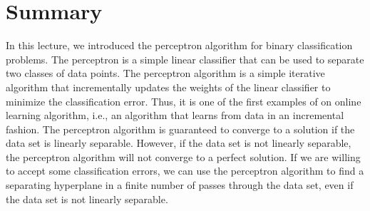 \documentclass{article}[12pt]
\begin{document}
\section{Summary}
In this lecture, we introduced the perceptron algorithm for binary classification problems.
The perceptron is a simple linear classifier that can be used to separate two classes of data points.
The perceptron algorithm is a simple iterative algorithm that incrementally updates the weights of the linear classifier to minimize the classification error.
Thus, it is one of the first examples of on online learning algorithm, i.e., an algorithm that learns from data in an incremental fashion.
The perceptron algorithm is guaranteed to converge to a solution if the data set is linearly separable.
However, if the data set is not linearly separable, the perceptron algorithm will not converge to a perfect solution.
If we are willing to accept some classification errors, we can use the perceptron algorithm to find a separating hyperplane in a finite number of passes through the data set, 
even if the data set is not linearly separable.


\end{document}
